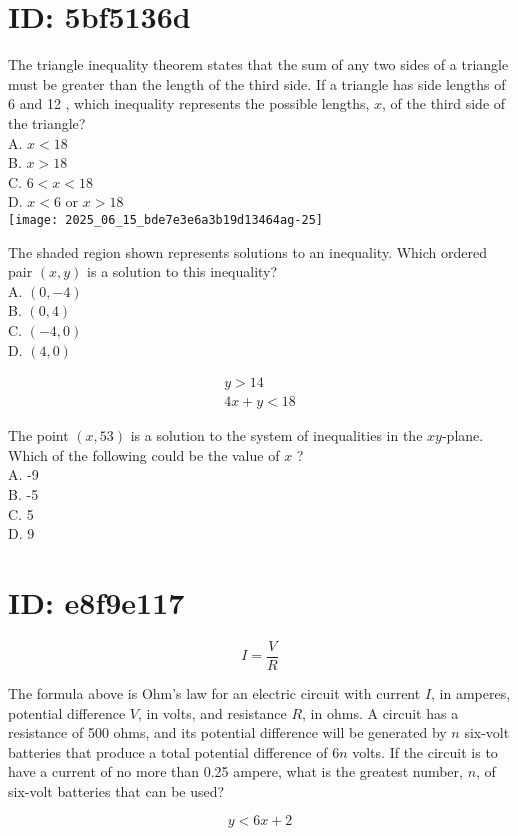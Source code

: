 \section*{ID: 5bf5136d}
The triangle inequality theorem states that the sum of any two sides of a triangle must be greater than the length of the third side. If a triangle has side lengths of 6 and 12 , which inequality represents the possible lengths, $x$, of the third side of the triangle?\\
A. $x<18$\\
B. $x>18$\\
C. $6<x<18$\\
D. $x<6$ or $x>18$\\
\texttt{[image: 2025\_06\_15\_bde7e3e6a3b19d13464ag-25]}

The shaded region shown represents solutions to an inequality. Which ordered pair $(x, y)$ is a solution to this inequality?\\
A. $(0,-4)$\\
B. $(0,4)$\\
C. $(-4,0)$\\
D. $(4,0)$

$$
\begin{gathered}
y>14 \\
4 x+y<18
\end{gathered}
$$

The point $(x, 53)$ is a solution to the system of inequalities in the $x y$-plane. Which of the following could be the value of $x$ ?\\
A. -9\\
B. -5\\
C. 5\\
D. 9

\section*{ID: e8f9e117}
$$
I=\frac{V}{R}
$$

The formula above is Ohm's law for an electric circuit with current $I$, in amperes, potential difference $V$, in volts, and resistance $R$, in ohms. A circuit has a resistance of 500 ohms, and its potential difference will be generated by $n$ six-volt batteries that produce a total potential difference of $6 n$ volts. If the circuit is to have a current of no more than 0.25 ampere, what is the greatest number, $n$, of six-volt batteries that can be used?

$$
y<6 x+2
$$

